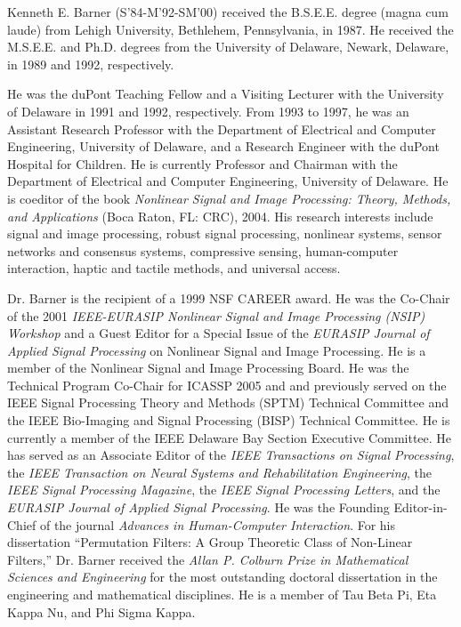 \documentclass[journal]{IEEEtran}
\begin{document}
\begin{IEEEbiography}{Kenneth E. Barner}
(S'84-M'92-SM'00) received the B.S.E.E. degree (magna cum laude) from Lehigh University, Bethlehem, Pennsylvania, in 1987. He received the M.S.E.E. and Ph.D. degrees from the University of Delaware, Newark, Delaware, in 1989 and 1992, respectively.

He was the duPont Teaching Fellow and a Visiting Lecturer with the University of Delaware in 1991 and 1992, respectively. From 1993 to 1997, he was an Assistant Research Professor with the Department of Electrical and Computer Engineering, University of Delaware, and a Research Engineer with the duPont Hospital for Children. He is currently Professor and Chairman with the Department of Electrical and Computer Engineering, University of Delaware. He is coeditor of the book \emph{Nonlinear Signal and Image Processing: Theory, Methods, and Applications} (Boca Raton, FL: CRC), 2004. His research interests include signal and image processing, robust signal processing, nonlinear systems, sensor networks and consensus systems, compressive sensing, human-computer interaction, haptic and tactile methods, and universal access.

Dr. Barner is the recipient of a 1999 NSF CAREER award. He was the Co-Chair of the 2001 \emph{IEEE-EURASIP Nonlinear Signal and Image Processing (NSIP) Workshop} and a Guest Editor for a Special Issue of the \emph{EURASIP Journal of Applied Signal Processing} on Nonlinear Signal and Image Processing. He is a member of the Nonlinear Signal and Image Processing Board. He was the Technical Program Co-Chair for ICASSP 2005 and and previously served on the IEEE Signal Processing Theory and Methods (SPTM) Technical Committee and the IEEE Bio-Imaging and Signal Processing (BISP) Technical Committee. He is currently a member of the IEEE Delaware Bay Section Executive Committee. He has served as an Associate Editor of the \emph{IEEE Transactions on Signal Processing}, the \emph{IEEE Transaction on Neural Systems and Rehabilitation Engineering}, the \emph{IEEE Signal Processing Magazine}, the \emph{IEEE Signal Processing Letters}, and the \emph{EURASIP Journal of Applied Signal Processing}. He was the Founding Editor-in-Chief of the journal \emph{Advances in Human-Computer Interaction}. For his dissertation ``Permutation Filters: A Group Theoretic Class of Non-Linear Filters,'' Dr. Barner received the \emph{Allan P. Colburn Prize in Mathematical Sciences and Engineering} for the most outstanding doctoral dissertation in the engineering and mathematical disciplines. He is a member of Tau Beta Pi, Eta Kappa Nu, and Phi Sigma Kappa.
\end{IEEEbiography}
\end{document}
